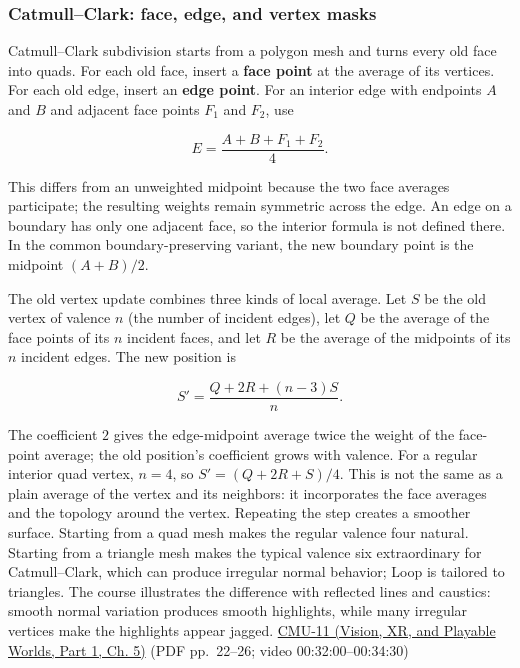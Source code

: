 \subsubsection{Catmull--Clark: face, edge, and vertex masks}\label{03-visual-computing-i-ch002-catmullclark-face-edge-and-vertex-masks}

\hypertarget{03-visual-computing-i-ch002-catmullclark-face-edge-and-vertex-masks}{}

Catmull--Clark subdivision starts from a polygon mesh and turns every old face into quads. For each old face, insert a \textbf{face point} at the average of its vertices. For each old edge, insert an \textbf{edge point}. For an interior edge with endpoints \(A\) and \(B\) and adjacent face points \(F_1\) and \(F_2\), use

\[
E=\frac{A+B+F_1+F_2}{4}.
\]

This differs from an unweighted midpoint because the two face averages participate; the resulting weights remain symmetric across the edge. An edge on a boundary has only one adjacent face, so the interior formula is not defined there. In the common boundary-preserving variant, the new boundary point is the midpoint \((A+B)/2\).

The old vertex update combines three kinds of local average. Let \(S\) be the old vertex of valence \(n\) (the number of incident edges), let \(Q\) be the average of the face points of its \(n\) incident faces, and let \(R\) be the average of the midpoints of its \(n\) incident edges. The new position is

\[
S'=\frac{Q+2R+(n-3)S}{n}.
\]

The coefficient \(2\) gives the edge-midpoint average twice the weight of the face-point average; the old position's coefficient grows with valence. For a regular interior quad vertex, \(n=4\), so \(S'=(Q+2R+S)/4\). This is not the same as a plain average of the vertex and its neighbors: it incorporates the face averages and the topology around the vertex. Repeating the step creates a smoother surface. Starting from a quad mesh makes the regular valence four natural. Starting from a triangle mesh makes the typical valence six extraordinary for Catmull--Clark, which can produce irregular normal behavior; Loop is tailored to triangles. The course illustrates the difference with reflected lines and caustics: smooth normal variation produces smooth highlights, while many irregular vertices make the highlights appear jagged. \href{../07-Vision-XR-and-Playable-Worlds-P01/main.pdf\#nameddest=04-visual-computing-ii-ch036-cmu-11---digital-geometry-processing}{CMU-11 (Vision, XR, and Playable Worlds, Part 1, Ch. 5)} (PDF pp.~22--26; video 00:32:00--00:34:30)

